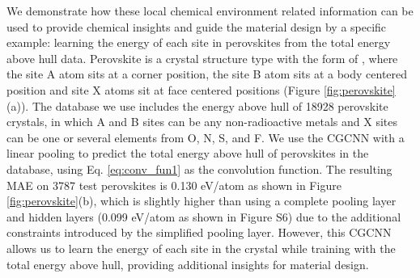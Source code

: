 \documentclass[twocolumn, prl]{revtex4-1}
\begin{document}
We demonstrate how these local chemical environment related information can be used to provide chemical insights and guide the material design by a specific example: learning the energy of each site in perovskites from the total energy above hull data. Perovskite is a crystal structure type with the form of , where the site A atom sits at a corner position, the site B atom sits at a body centered position and site X atoms sit at face centered positions (Figure \ref{fig:perovskite}(a)). The database\cite{castelli2012computational} we use includes the energy above hull of 18928 perovskite crystals, in which A and B sites can be any non-radioactive metals and X sites can be one or several elements from O, N, S, and F. We use the CGCNN with a linear pooling to predict the total energy above hull of perovskites in the database, using Eq. \ref{eq:conv_fun1} as the convolution function. The resulting MAE on 3787 test perovskites is 0.130 eV/atom as shown in Figure \ref{fig:perovskite}(b), which is slightly higher than using a complete pooling layer and  hidden layers (0.099 eV/atom as shown in Figure S6) due to the additional constraints introduced by the simplified pooling layer. However, this CGCNN allows us to learn the energy of each site in the crystal while training with the total energy above hull, providing additional insights for material design.  
\end{document}
